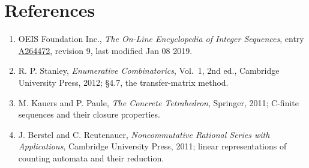 \documentclass[11pt]{article}
\theoremstyle{definition}
\begin{document}
\section{References}

\begin{enumerate}

\item OEIS Foundation Inc., \emph{The On-Line Encyclopedia of Integer Sequences}, entry \href{https://oeis.org/A264472}{A264472}, revision 9, last modified Jan 08 2019.

\item R. P. Stanley, \emph{Enumerative Combinatorics}, Vol.~1, 2nd ed., Cambridge University Press, 2012; \S4.7, the transfer-matrix method.

\item M. Kauers and P. Paule, \emph{The Concrete Tetrahedron}, Springer, 2011; C-finite sequences and their closure properties.

\item J. Berstel and C. Reutenauer, \emph{Noncommutative Rational Series with Applications}, Cambridge University Press, 2011; linear representations of counting automata and their reduction.

\end{enumerate}
\end{document}

